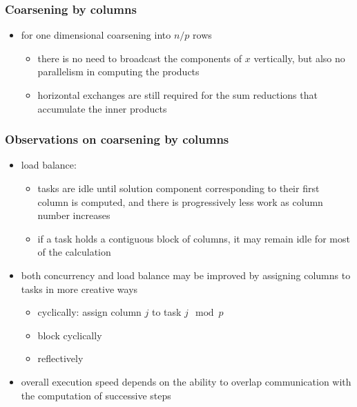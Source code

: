 \begin{frame}[fragile]
%
  \frametitle{Coarsening by columns}
%
  \begin{itemize}
%
  \item for one dimensional coarsening into $n/p$ rows
    \begin{itemize}
    \item there is no need to broadcast the components of $x$ vertically, but also no
      parallelism in computing the products
    \item horizontal exchanges are still required for the sum reductions that accumulate the
      inner products
    \end{itemize}
%
  \begin{center}
    \begin{minipage}{.85\linewidth}
      \begin{algorithm}[H]
%
        \dontprintsemicolon
        \nocaptionofalgo
        \setalcaphskip{0ex}
%
% 
      \end{algorithm}
    \end{minipage}
  \end{center}
%
  \end{itemize}
%
\end{frame}

\begin{frame}[fragile]
%
  \frametitle{Observations on coarsening by columns}
%
  \begin{itemize}
%
%
  \item load balance:
    \begin{itemize}
    \item tasks are idle until solution component corresponding to their first column is
      computed, and there is progressively less work as column number increases
    \item if a task holds a contiguous block of columns, it may remain idle for most of the
      calculation
    \end{itemize}
%
  \item both concurrency and load balance may be improved by assigning columns to tasks in more
    creative ways
    \begin{itemize}
    \item cyclically: assign column $j$ to task $j \mod p$
    \item block cyclically
    \item reflectively
    \end{itemize}
%
  \item overall execution speed depends on the ability to overlap communication with the
    computation of successive steps
%
  \end{itemize}
%
\end{frame}

